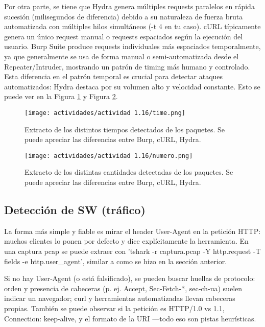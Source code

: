 \documentclass[letter,12pt]{article}
\begin{document}
Por otra parte, se tiene que Hydra genera múltiples requests paralelos en rápida sucesión (milisegundos de diferencia) debido a su naturaleza de fuerza bruta automatizada con múltiples hilos simultáneos (-t 4 en tu caso). cURL típicamente genera un único request manual o requests espaciados según la ejecución del usuario. Burp Suite produce requests individuales más espaciados temporalmente, ya que generalmente se usa de forma manual o semi-automatizada desde el Repeater/Intruder, mostrando un patrón de timing más humano y controlado. Esta diferencia en el patrón temporal es crucial para detectar ataques automatizados: Hydra destaca por su volumen alto y velocidad constante. Esto se puede ver en la Figura \ref{actividad 1.16 time} y Figura \ref{actividad 1.16 numero}.

\begin{figure}[H]
    \centering
    \texttt{[image: actividades/actividad 1.16/time.png]}
    \caption{Extracto de los distintos tiempos detectados de los paquetes. Se puede apreciar las diferencias entre Burp, cURL, Hydra.}
    \label{actividad 1.16 time}
\end{figure}

\begin{figure}[H]
    \centering
    \texttt{[image: actividades/actividad 1.16/numero.png]}
    \caption{Extracto de los distintas cantidades detectadas de los paquetes. Se puede apreciar las diferencias entre Burp, cURL, Hydra.}
    \label{actividad 1.16 numero}
\end{figure}

\subsection{Detección de SW (tráfico)}
La forma más simple y fiable es mirar el header User-Agent en la petición HTTP: muchos clientes lo ponen por defecto y dice explícitamente la herramienta. En una captura pcap se puede extraer con 'tshark -r captura.pcap -Y http.request -T fields -e http.user\_agent', similar a como se hizo en la sección anterior.

Si no hay User‑Agent (o está falsificado), se pueden buscar huellas de protocolo: orden y presencia de cabeceras (p. ej. Accept, Sec‑Fetch-*, sec‑ch-ua) suelen indicar un navegador; curl y herramientas automatizadas llevan cabeceras  propias. También se puede observar si la petición es HTTP/1.0 vs 1.1, Connection: keep-alive, y el formato de la URI —todo eso son pistas heurísticas.
\end{document}
